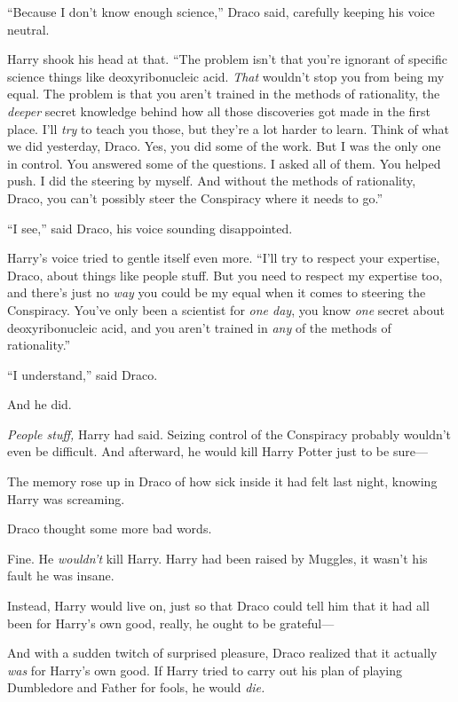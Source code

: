 “Because I don’t know enough science,” Draco said, carefully keeping his voice neutral.

Harry shook his head at that. “The problem isn’t that you’re ignorant of specific science things like deoxyribonucleic acid. \emph{That} wouldn’t stop you from being my equal. The problem is that you aren’t trained in the methods of rationality, the \emph{deeper} secret knowledge behind how all those discoveries got made in the first place. I’ll \emph{try} to teach you those, but they’re a lot harder to learn. Think of what we did yesterday, Draco. Yes, you did some of the work. But I was the only one in control. You answered some of the questions. I asked all of them. You helped push. I did the steering by myself. And without the methods of rationality, Draco, you can’t possibly steer the Conspiracy where it needs to go.”

“I see,” said Draco, his voice sounding disappointed.

Harry’s voice tried to gentle itself even more. “I’ll try to respect your expertise, Draco, about things like people stuff. But you need to respect my expertise too, and there’s just no \emph{way} you could be my equal when it comes to steering the Conspiracy. You’ve only been a scientist for \emph{one day}, you know \emph{one} secret about deoxyribonucleic acid, and you aren’t trained in \emph{any} of the methods of rationality.”

“I understand,” said Draco.

And he did.

\emph{People stuff,} Harry had said. Seizing control of the Conspiracy probably wouldn’t even be difficult. And afterward, he would kill Harry Potter just to be sure—

The memory rose up in Draco of how sick inside it had felt last night, knowing Harry was screaming.

Draco thought some more bad words.

Fine. He \emph{wouldn’t} kill Harry. Harry had been raised by Muggles, it wasn’t his fault he was insane.

Instead, Harry would live on, just so that Draco could tell him that it had all been for Harry’s own good, really, he ought to be grateful—

And with a sudden twitch of surprised pleasure, Draco realized that it actually \emph{was} for Harry’s own good. If Harry tried to carry out his plan of playing Dumbledore and Father for fools, he would \emph{die.}

